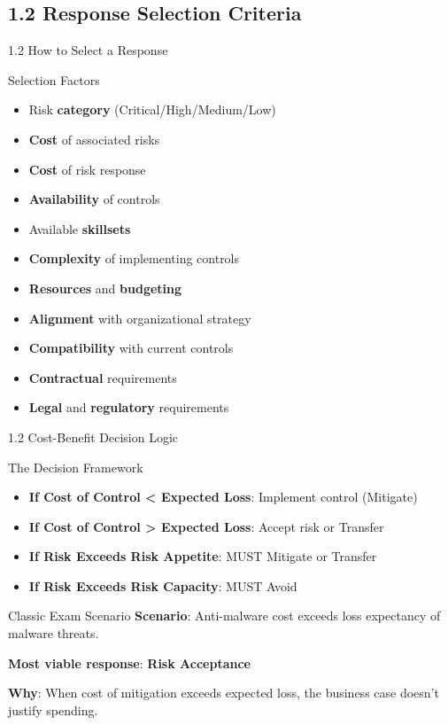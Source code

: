 \documentclass{beamer}
\begin{document}
	\subsection{1.2 Response Selection Criteria}
	\begin{frame}{1.2 How to Select a Response}
		\begin{block}{Selection Factors}
			\begin{itemize}
				\item Risk \textbf{category} (Critical/High/Medium/Low)
				\item \textbf{Cost} of associated risks
				\item \textbf{Cost} of risk response
				\item \textbf{Availability} of controls
				\item Available \textbf{skillsets}
				\item \textbf{Complexity} of implementing controls
				\item \textbf{Resources} and \textbf{budgeting}
				\item \textbf{Alignment} with organizational strategy
				\item \textbf{Compatibility} with current controls
				\item \textbf{Contractual} requirements
				\item \textbf{Legal} and \textbf{regulatory} requirements
			\end{itemize}
		\end{block}
	\end{frame}
	
	\begin{frame}{1.2 Cost-Benefit Decision Logic}
		\begin{block}{The Decision Framework}
			\begin{itemize}
				\item \textbf{If Cost of Control < Expected Loss}: Implement control (Mitigate)
				\item \textbf{If Cost of Control > Expected Loss}: Accept risk or Transfer
				\item \textbf{If Risk Exceeds Risk Appetite}: MUST Mitigate or Transfer
				\item \textbf{If Risk Exceeds Risk Capacity}: MUST Avoid
			\end{itemize}
		\end{block}
		
		\begin{exampleblock}{Classic Exam Scenario}
			\textbf{Scenario}: Anti-malware cost exceeds loss expectancy of malware threats.
			
			\textbf{Most viable response}: \textbf{Risk Acceptance}
			
			\textbf{Why}: When cost of mitigation exceeds expected loss, the business case doesn't justify spending.
		\end{exampleblock}
	\end{frame}
	
\end{document}
